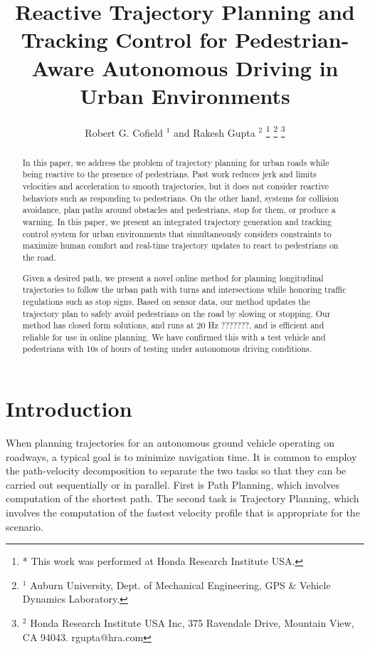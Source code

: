 \documentclass[letterpaper, 10 pt, conference]{ieeeconf}  %
\title{\LARGE \bf
  Reactive Trajectory Planning and Tracking Control for Pedestrian-Aware Autonomous Driving in Urban Environments
}
\author{
  Robert G. Cofield $^{1}$ and
  Rakesh Gupta $^{2}$
  \thanks{
    * This work was performed at Honda Research Institute USA.
  }
  \thanks{
    $^{1}$ Auburn University, Dept. of Mechanical Engineering, GPS \& Vehicle Dynamics Laboratory.
  }
  \thanks{
    $^{2}$ Honda Research Institute USA Inc, 375 Ravendale Drive, Mountain View, CA 94043. rgupta@hra.com
  }
}
\begin{document}
\maketitle
\thispagestyle{empty}
\pagestyle{empty}

\begin{abstract}

In this paper, we address the problem of trajectory planning for urban roads while being 
reactive to the presence of pedestrians.
Past work reduces jerk and limits velocities and acceleration to smooth trajectories, but it does not consider 
reactive behaviors such as responding to pedestrians. On the other hand, systems for collision 
avoidance, plan paths around obstacles and pedestrians, stop for them, or produce a warning. 
In this paper, we present an integrated trajectory generation and tracking control system for urban 
environments that simultaneously considers constraints to maximize human comfort and real-time  
trajectory updates to react to pedestrians on the road. 

Given a desired path, we present a novel online method for planning longitudinal trajectories 
to follow the urban path with turns and intersections while honoring traffic regulations such 
as stop signs. Based on sensor data, our method updates the trajectory plan to safely avoid 
pedestrians on the road by slowing or stopping.
Our method has closed form solutions, and runs at 20 Hz ???????, and is efficient and reliable 
for use in online planning. We have confirmed this with
a test vehicle and pedestrians with 10s of hours of testing under autonomous driving conditions.

\end{abstract}

\section{Introduction} \label{sec:introduction}

When planning trajectories for an autonomous ground vehicle operating on roadways, a typical goal is to minimize navigation time.
It is common to employ the path-velocity decomposition to separate the two tasks so that they can be carried out sequentially or in parallel.
First is Path Planning, which involves computation of the shortest path.
The second task is Trajectory Planning, which involves the computation of the fastest velocity profile that is appropriate for the scenario.
\end{document}

